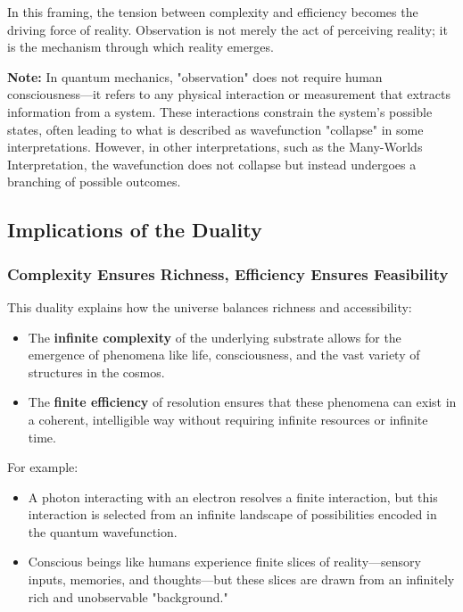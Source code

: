 \documentclass[12pt]{article}
\begin{document}
In this framing, the tension between complexity and efficiency becomes the driving force of reality. Observation is not merely the act of perceiving reality; it is the mechanism through which reality emerges.

\textbf{Note:} In quantum mechanics, "observation" does not require human consciousness—it refers to any physical interaction or measurement that extracts information from a system. These interactions constrain the system’s possible states, often leading to what is described as wavefunction "collapse" in some interpretations. However, in other interpretations, such as the Many-Worlds Interpretation, the wavefunction does not collapse but instead undergoes a branching of possible outcomes.

\subsection{Implications of the Duality}

\subsubsection{Complexity Ensures Richness, Efficiency Ensures Feasibility}

This duality explains how the universe balances richness and accessibility:
\begin{itemize}
    \item The \textbf{infinite complexity} of the underlying substrate allows for the emergence of phenomena like life, consciousness, and the vast variety of structures in the cosmos.
    \item The \textbf{finite efficiency} of resolution ensures that these phenomena can exist in a coherent, intelligible way without requiring infinite resources or infinite time.
\end{itemize}

For example:
\begin{itemize}
    \item A photon interacting with an electron resolves a finite interaction, but this interaction is selected from an infinite landscape of possibilities encoded in the quantum wavefunction.
    \item Conscious beings like humans experience finite slices of reality—sensory inputs, memories, and thoughts—but these slices are drawn from an infinitely rich and unobservable "background."
\end{itemize}
\end{document}

